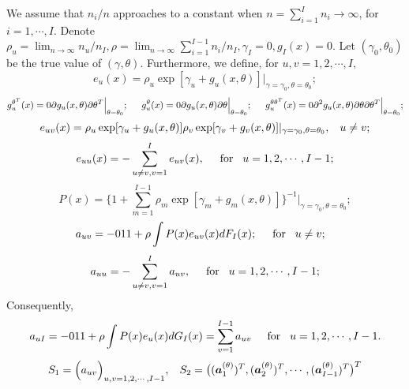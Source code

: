 \documentclass[11pt]{article}
\theoremstyle{plain}
\theoremstyle{definition}
\theoremstyle{remark}
\theoremstyle{definition}
\begin{document}
We assume that $n_i/n$ approaches to a constant when $n=\sum_{i=1}^I n_i \rightarrow \infty$, for $i=1,\cdots, I$.
Denote $ \rho_u=\lim_{n\rightarrow \infty} n_u/n_I, \rho =\lim_{n\rightarrow \infty} \sum_{i=1}^{I-1} n_i/n_I, \gamma_I=0, g_I(x)=0$. Let $(\gamma_0, \theta_0)$ be the true value of $(\gamma, \theta)$. Furthermore, we define, for $u, v = 1, 2,\cdots, I,$
\begin{equation}
e_{u}(x)=\rho_u\exp[\gamma_{u}+ g_u(x,\theta)]\Big|_{\scriptstyle\gamma=\gamma_0 , \scriptstyle\theta=\theta_0};\label{e_u}
\end{equation}
\begin{equation}
g_u^{\theta^T}(x)=\frac{\partial g_u(x,\theta)}{\partial \theta^T}\Big|_{\theta=\theta_0};\hspace{5mm}g_u^{\theta}(x)=\frac{\partial
g_u(x,\theta)}{\partial \theta}\Big|_{\theta=\theta_0};
\hspace{5mm}g_u^{\theta\theta^T}(x)=\frac{\partial^2
g_u(x,\theta)}{\partial \theta\partial \theta^T}\Big|_{\theta=\theta_0};\label{g_derivative}
\end{equation}
$$
e_{uv}(x)=\rho_u\exp[\gamma_{u}+ g_u(x,\theta)]\rho_v\exp[\gamma_{v}+g_v(x,\theta)]|_{\gamma=\gamma_0,
\theta=\theta_0},\hspace{3mm}u\ne v;\label{e_uv}
$$
$$
e_{uu}(x)=-\sum_{u \ne v, v=1}^{I}e_{uv}(x),\hspace{5mm}\mbox{for}\hspace{3mm}u=1,2,\cdots,I-1;
$$
\begin{equation}
P(x)=\{1+\sum_{m=1}^{I-1 } \rho_m\exp[\gamma_{m}+g_m(x,\theta)]\}^{-1}\big|_{\gamma=\gamma_0,
\theta=\theta_0};\label{P}
\end{equation}
$$
a_{uv}=-\frac{1}{1+\rho}\int P(x)e_{uv}(x)dF_I(x);\hspace{5mm}\mbox{for} \hspace{3mm} u \ne v;\hspace{3mm}
$$
$$
a_{uu}=-\sum_{u\ne v, v=1}^I a_{uv}, \hspace{5mm}\mbox{for}\hspace{3mm}u=1,2,\cdots,I-1;
$$
Consequently,
$$
a_{uI}=-\frac{1}{1+\rho}\int P(x)e_{u}(x)dG_I(x) =\sum_{v=1}^{I-1}a_{uv}\hspace{5mm}\mbox{for} \hspace{3mm}
u=1,2,\cdots,I-1.
$$
\begin{equation}
S_1=\Big(a_{uv} \Big)_{u,v=1, 2, \cdots, I-1}, \hspace{3mm} S_2=\big((\bm{a}_1^{(\theta)})^T,(\bm{a}_2^{(\theta)})^T,\cdots,
(\bm{a}_{I-1}^{(\theta)})^T  \big)^T\label{S1_S2}
\end{equation}
\end{document}
